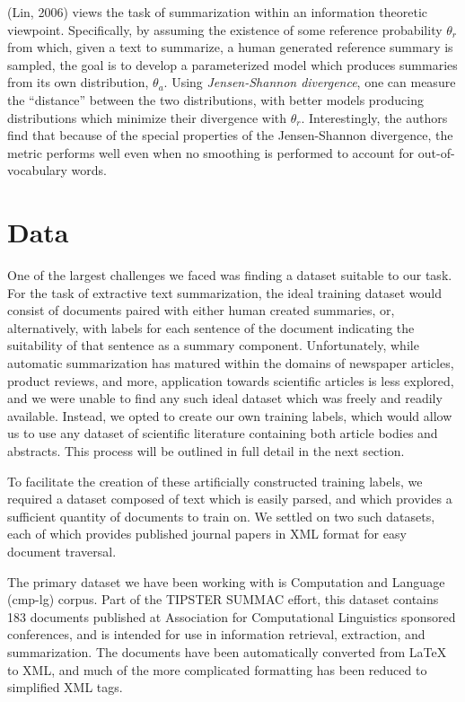 \documentclass[11pt]{article}
\begin{document}
	(Lin, 2006) views the task of summarization within an information theoretic viewpoint. Specifically, by assuming the existence of some reference probability $\theta_{r}$ from which, given a text to summarize, a human generated reference summary is sampled, the goal is to develop a parameterized model which produces summaries from its own distribution, $\theta_{a}$. Using \emph{Jensen-Shannon divergence}, one can measure the ``distance'' between the two distributions, with better models producing distributions which minimize their divergence with $ \theta_{r}$. Interestingly, the authors find that because of the special properties of the Jensen-Shannon divergence, the metric performs well even when no smoothing is performed to account for out-of-vocabulary words.
	 

\section{Data} %
	One of the largest challenges we faced was finding a dataset suitable to our task. For the task of extractive text summarization, the ideal training dataset would consist of documents paired with either human created summaries, or, alternatively, with labels for each sentence of the document indicating the suitability of that sentence as a summary component. Unfortunately, while automatic summarization has matured within the domains of newspaper articles, product reviews, and more, application towards scientific articles is less explored, and we were unable to find any such ideal dataset which was freely and readily available. Instead, we opted to create our own training labels, which would allow us to use any dataset of scientific literature containing both article bodies and abstracts. This process will be outlined in full detail in the next section.

	To facilitate the creation of these artificially constructed training labels, we required a dataset composed of text which is easily parsed, and which provides a sufficient quantity of documents to train on. We settled on two such datasets, each of which provides published journal papers in XML format for easy document traversal.
	
	The primary dataset we have been working with is Computation and Language (cmp-lg) corpus. Part of the TIPSTER SUMMAC effort, this dataset contains 183 documents published at Association for Computational Linguistics sponsored conferences, and is intended for use in information retrieval, extraction, and summarization. The documents have been automatically converted from LaTeX to XML, and much of the more complicated formatting has been reduced to simplified XML tags.
	
\end{document}
